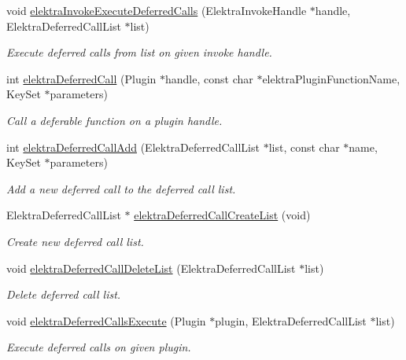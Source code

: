 \begin{DoxyCompactItemize}
void \hyperlink{group__invoke_ga933ae8c38aadef6af1462297fcfb5041}{elektra\+Invoke\+Execute\+Deferred\+Calls} (Elektra\+Invoke\+Handle $\ast$handle, Elektra\+Deferred\+Call\+List $\ast$list)
\begin{DoxyCompactList}\small\item\em Execute deferred calls from list on given invoke handle. \end{DoxyCompactList}\item 
int \hyperlink{group__invoke_ga80328407d9d418af04c54ab5f10a63c0}{elektra\+Deferred\+Call} (Plugin $\ast$handle, const char $\ast$elektra\+Plugin\+Function\+Name, Key\+Set $\ast$parameters)
\begin{DoxyCompactList}\small\item\em Call a deferable function on a plugin handle. \end{DoxyCompactList}\item 
int \hyperlink{group__invoke_gaa6200aa148a20b58d62cd8cc73f293ce}{elektra\+Deferred\+Call\+Add} (Elektra\+Deferred\+Call\+List $\ast$list, const char $\ast$name, Key\+Set $\ast$parameters)
\begin{DoxyCompactList}\small\item\em Add a new deferred call to the deferred call list. \end{DoxyCompactList}\item 
Elektra\+Deferred\+Call\+List $\ast$ \hyperlink{group__invoke_gacff96e795f6fc2fad61ed2f8a5cd80cb}{elektra\+Deferred\+Call\+Create\+List} (void)
\begin{DoxyCompactList}\small\item\em Create new deferred call list. \end{DoxyCompactList}\item 
void \hyperlink{group__invoke_ga7b9d8b37ebd5205fded885164d3ad6b7}{elektra\+Deferred\+Call\+Delete\+List} (Elektra\+Deferred\+Call\+List $\ast$list)
\begin{DoxyCompactList}\small\item\em Delete deferred call list. \end{DoxyCompactList}\item 
void \hyperlink{group__invoke_gad59c673dce3c2f08fbe52c5c667f55ce}{elektra\+Deferred\+Calls\+Execute} (Plugin $\ast$plugin, Elektra\+Deferred\+Call\+List $\ast$list)
\begin{DoxyCompactList}\small\item\em Execute deferred calls on given plugin. \end{DoxyCompactList}\end{DoxyCompactItemize}


